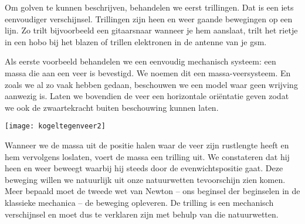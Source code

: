 \documentclass{ximera}
\begin{document}
	\author{Bart Lambregs}
    \xmsource\xmuitleg



	Om golven te kunnen beschrijven, behandelen we eerst trillingen. Dat is een iets eenvoudiger verschijnsel. Trillingen zijn heen en weer gaande bewegingen op een lijn. Zo trilt bijvoorbeeld een gitaarsnaar wanneer je hem aanslaat, trilt het rietje in een hobo bij het blazen of trillen elektronen in de antenne van je gsm.
	

	

	
	
	
	Als eerste voorbeeld behandelen we een eenvoudig mechanisch systeem: een massa die aan een veer is bevestigd. We noemen dit een massa-veersysteem. En zoals we al zo vaak hebben gedaan, beschouwen we een model waar geen wrijving aanwezig is. Laten we bovendien de veer een horizontale oriëntatie geven zodat we ook de zwaartekracht buiten beschouwing kunnen laten.
	\begin{image}
	
	\texttt{[image: kogeltegenveer2]}
	\end{image}
	Wanneer we de massa uit de positie halen waar de veer zijn rustlengte heeft en hem vervolgens loslaten, voert de massa een trilling uit. We constateren dat hij heen en weer beweegt waarbij hij steeds door de evenwichtspositie gaat. Deze beweging willen we natuurlijk uit onze natuurwetten tevoorschijn zien komen. Meer bepaald moet de tweede wet van Newton -- ons beginsel der beginselen in de klassieke mechanica -- de beweging opleveren. De trilling is een mechanisch verschijnsel en moet dus te verklaren zijn met behulp van die natuurwetten. 
	
\end{document}
